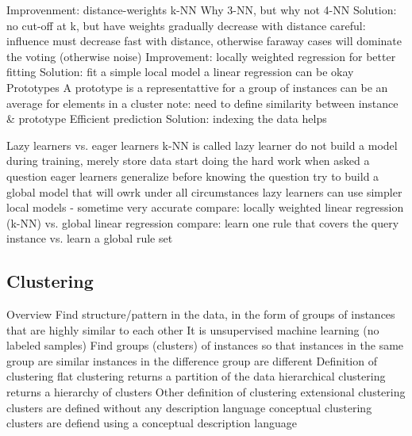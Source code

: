 \begin{outline}
    \1 Improvenment: distance-werights k-NN
        \2 Why 3-NN, but why not 4-NN
            \3 Solution: no cut-off at k, but have weights gradually decrease with distance
            \3 careful: influence must decrease fast with distance, otherwise faraway cases will dominate the voting (otherwise noise)
    \1 Improvement: locally weighted regression
        \2 for better fitting
            \3 Solution: fit a simple local model
            \3 a linear regression can be okay
    \1 Prototypes
        \2 A prototype is a representattive for a group of instances
        \2 can be an average for elements in a cluster
        \2 note: need to define similarity between instance \& prototype
    \1 Efficient prediction
        \2 Solution: indexing the data helps
\end{outline}

\begin{outline}
    \1 Lazy learners vs. eager learners
        \2 k-NN is called lazy learner
            \3 do not build a model during training, merely store data
            \3 start doing the hard work when asked a question
        \2 eager learners
            \3 generalize before knowing the question
            \3 try to build a global model that will owrk under all circumstances
        \2 lazy learners can use simpler local models - sometime very accurate
            \3 compare: locally weighted linear regression (k-NN) vs. global linear regression
            \3 compare: learn one rule that covers the query instance vs. learn a global rule set
\end{outline}

\subsection{Clustering}
\begin{outline}
    \1 Overview
        \2 Find structure/pattern in the data, in the form of groups of instances that are highly similar to each other
        \2 It is unsupervised machine learning (no labeled samples)
    \1 Find groups (clusters) of instances so that
        \2 instances in the same group are similar
        \2 instances in the difference group are different 
    \1 Definition of clustering
        \2 flat clustering
            \3 returns a partition of the data
        \2 hierarchical clustering
            \3 returns a hierarchy of clusters
    \1 Other definition of clustering
        \2 extensional clustering
            \3 clusters are defined without any description language
        \2 conceptual clustering
            \3 clusters are defiend using a conceptual description language
\end{outline}

